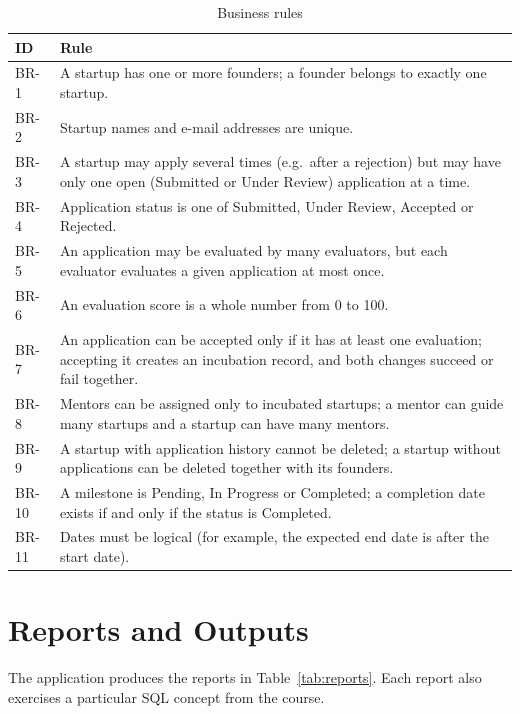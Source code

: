 \begin{table}[H]
  \centering
  \caption{Business rules}
  \label{tab:br}
  \begin{tabularx}{\textwidth}{@{}lX@{}}
    \toprule
    \textbf{ID} & \textbf{Rule} \\
    \midrule
    BR-1  & A startup has one or more founders; a founder belongs to exactly one startup. \\
    BR-2  & Startup names and e-mail addresses are unique. \\
    BR-3  & A startup may apply several times (e.g.\ after a rejection) but may have only one
            open (Submitted or Under Review) application at a time. \\
    BR-4  & Application status is one of Submitted, Under Review, Accepted or Rejected. \\
    BR-5  & An application may be evaluated by many evaluators, but each evaluator evaluates a
            given application at most once. \\
    BR-6  & An evaluation score is a whole number from 0 to 100. \\
    BR-7  & An application can be accepted only if it has at least one evaluation; accepting it
            creates an incubation record, and both changes succeed or fail together. \\
    BR-8  & Mentors can be assigned only to incubated startups; a mentor can guide many startups
            and a startup can have many mentors. \\
    BR-9  & A startup with application history cannot be deleted; a startup without applications
            can be deleted together with its founders. \\
    BR-10 & A milestone is Pending, In Progress or Completed; a completion date exists if and only
            if the status is Completed. \\
    BR-11 & Dates must be logical (for example, the expected end date is after the start date). \\
    \bottomrule
  \end{tabularx}
\end{table}

\section{Reports and Outputs}
\label{sec:reports}
The application produces the reports in Table~\ref{tab:reports}. Each report also exercises a
particular SQL concept from the course.

